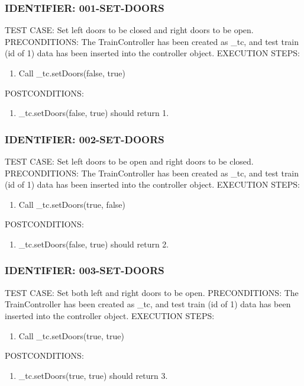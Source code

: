 \documentclass{scrreprt}
\begin{document}
\subsubsection{IDENTIFIER: 001-SET-DOORS}
TEST CASE: Set left doors to be closed and right doors to be open.
PRECONDITIONS: The TrainController has been created as _tc, and test train (id of 1) data has been inserted into the controller object.
EXECUTION STEPS:
\begin{enumerate}
	\item Call _tc.setDoors(false, true)
\end{enumerate}
POSTCONDITIONS:
\begin{enumerate}
	\item _tc.setDoors(false, true) should return 1.
\end{enumerate}

\subsubsection{IDENTIFIER: 002-SET-DOORS}
TEST CASE: Set left doors to be open and right doors to be closed.
PRECONDITIONS: The TrainController has been created as _tc, and test train (id of 1) data has been inserted into the controller object.
EXECUTION STEPS:
\begin{enumerate}
	\item Call _tc.setDoors(true, false)
\end{enumerate}
POSTCONDITIONS:
\begin{enumerate}
	\item _tc.setDoors(false, true) should return 2.
\end{enumerate}

\subsubsection{IDENTIFIER: 003-SET-DOORS}
TEST CASE: Set both left and right doors to be open.
PRECONDITIONS: The TrainController has been created as _tc, and test train (id of 1) data has been inserted into the controller object.
EXECUTION STEPS:
\begin{enumerate}
	\item Call _tc.setDoors(true, true)
\end{enumerate}
POSTCONDITIONS:
\begin{enumerate}
	\item _tc.setDoors(true, true) should return 3.
\end{enumerate}
\end{document}

